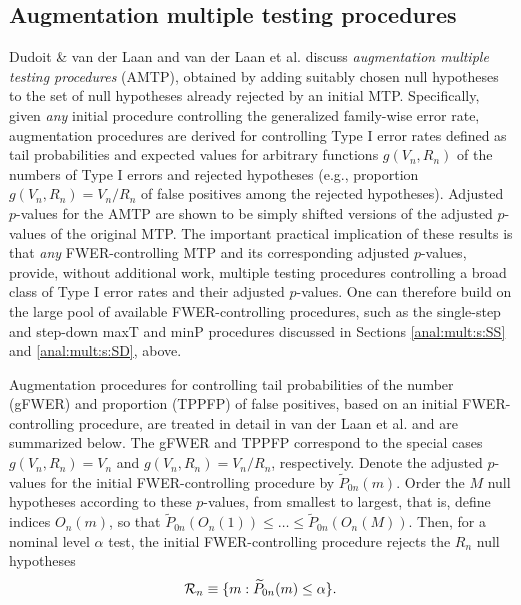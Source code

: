 \documentclass[11pt]{article}
\begin{document}
\subsection{Augmentation multiple testing procedures}
\label{anal:mult:s:AMTP}

Dudoit \& van der Laan \cite{Dudoit&vdLaanMTBook} and van der Laan et al. \cite{vdLaanetalMT3SAGMB04} discuss {\em augmentation multiple testing procedures} (AMTP), obtained by adding suitably chosen null hypotheses to the set of null hypotheses already rejected by an initial MTP. 
Specifically, given {\em any} initial procedure controlling the generalized family-wise error rate, augmentation procedures are derived for controlling Type I error rates defined as tail probabilities and expected values for arbitrary functions $g(V_n,R_n)$ of the numbers of Type I errors and rejected hypotheses (e.g., proportion $g(V_n,R_n)=V_n/R_n$ of false positives among the rejected hypotheses). 
Adjusted $p$-values for the AMTP are shown to be simply shifted versions of the adjusted $p$-values of the original MTP. 
The important practical implication of these results is that {\em any} FWER-controlling MTP and its
corresponding adjusted $p$-values, provide, without additional work, multiple testing procedures controlling a broad class of Type I error rates and their adjusted $p$-values.
One can therefore build on the large pool of available FWER-controlling procedures, such as the single-step and step-down maxT and minP procedures discussed in Sections \ref{anal:mult:s:SS} and \ref{anal:mult:s:SD}, above. 

Augmentation procedures for controlling tail probabilities of the number (gFWER) and proportion (TPPFP) of false positives, based on an initial FWER-controlling procedure, are treated in detail in van der Laan et al. \cite{vdLaanetalMT3SAGMB04} and are summarized below. The gFWER and TPPFP correspond to the special cases $g(V_n,R_n) = V_n$ and  $g(V_n,R_n) = V_n/R_n$, respectively. 
Denote the adjusted $p$-values for the initial FWER-controlling procedure by $\widetilde{P}_{0n}(m)$. Order the $M$ null hypotheses according to these $p$-values, from smallest to largest, that is, define indices $O_n(m)$, so that $\widetilde{P}_{0n}(O_n(1))\leq \ldots \leq \widetilde{P}_{0n}(O_n(M))$. Then, for a nominal level $\alpha$ test, the initial FWER-controlling procedure rejects the $R_n$ null hypotheses 
\begin{equation}
{\cal R}_n \equiv \{m: \widetilde{P}_{0n}(m) \leq \alpha\}.
\end{equation}
\end{document}
